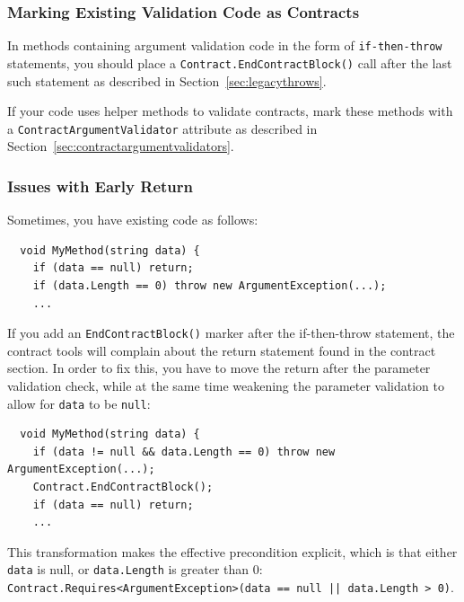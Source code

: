 \documentclass{article}
\newcommand{\code}[1]{\lstinline{#1}}
\begin{document}
\subsubsection{Marking Existing Validation Code as Contracts}
In methods containing argument validation code in the form of
\code{if-then-throw} statements, you should place a
\code{Contract.EndContractBlock()} call after the last such
statement as described in Section~\ref{sec:legacythrows}.

If your code uses helper methods to validate contracts, mark these methods
with a \code{ContractArgumentValidator} attribute as described in
Section~\ref{sec:contractargumentvalidators}.

\subsubsection{Issues with Early Return}
Sometimes, you have existing code as follows:
\begin{lstlisting}
  void MyMethod(string data) {
    if (data == null) return;
    if (data.Length == 0) throw new ArgumentException(...);
    ...
\end{lstlisting}
If you add an \code{EndContractBlock()} marker after the if-then-throw
statement, the contract tools will complain about the return statement
found in the contract section. In order to fix this, you have to move
the return after the parameter validation check, while at the same
time weakening the parameter validation to allow for \code{data} to be \code{null}:
\begin{lstlisting}
  void MyMethod(string data) {
    if (data != null && data.Length == 0) throw new ArgumentException(...);
    Contract.EndContractBlock();
    if (data == null) return;
    ...
\end{lstlisting}
This transformation makes the effective precondition explicit, which is
that either \code{data} is null, or \code{data.Length} is greater than
0: \code{Contract.Requires<ArgumentException>(data == null || data.Length > 0)}.
\end{document}
